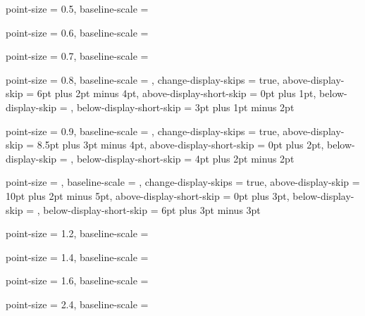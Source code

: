   {
    point-size     = \ScaleToNearestTenthPoint {\NormalPointSize} {0.5},
    baseline-scale = \NormalBaselineScale
  }

  {
    point-size     = \ScaleToNearestTenthPoint {\NormalPointSize} {0.6},
    baseline-scale = \NormalBaselineScale
  }

  {
    point-size     = \ScaleToNearestTenthPoint {\NormalPointSize} {0.7},
    baseline-scale = \NormalBaselineScale
  }

  {
    point-size               = \ScaleToNearestTenthPoint {\NormalPointSize} {0.8},
    baseline-scale           = \NormalBaselineScale,
    change-display-skips     = true,
    above-display-skip       = 6pt plus 2pt minus 4pt,
    above-display-short-skip = 0pt plus 1pt,
    below-display-skip       = ,
    below-display-short-skip = 3pt plus 1pt minus 2pt
  }

  {
    point-size               = \ScaleToNearestTenthPoint {\NormalPointSize} {0.9},
    baseline-scale           = \NormalBaselineScale,
    change-display-skips     = true,
    above-display-skip       = 8.5pt plus 3pt minus 4pt,
    above-display-short-skip = 0pt plus 2pt,
    below-display-skip       = ,
    below-display-short-skip = 4pt plus 2pt minus 2pt
  }

  {
    point-size               = \NormalPointSize,
    baseline-scale           = \NormalBaselineScale,
    change-display-skips     = true,
    above-display-skip       = 10pt plus 2pt minus 5pt,
    above-display-short-skip = 0pt plus 3pt,
    below-display-skip       = ,
    below-display-short-skip = 6pt plus 3pt minus 3pt
  }

  {
    point-size     = \ScaleToNearestTenthPoint {\NormalPointSize} {1.2},
    baseline-scale = \NormalBaselineScale
  }

  {
    point-size     = \ScaleToNearestTenthPoint {\NormalPointSize} {1.4},
    baseline-scale = \NormalBaselineScale
  }

  {
    point-size     = \ScaleToNearestTenthPoint {\NormalPointSize} {1.6},
    baseline-scale = \NormalBaselineScale
  }

  {
    point-size     = \ScaleToNearestTenthPoint {\NormalPointSize} {2.4},
    baseline-scale = \NormalBaselineScale
  }

